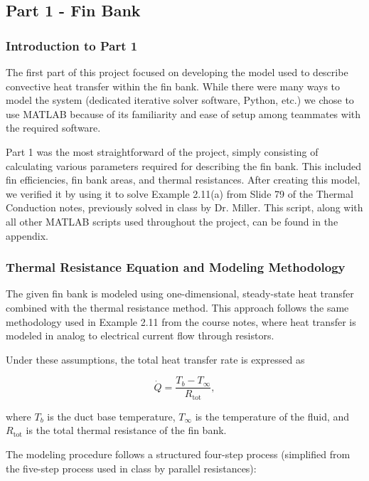 \documentclass[12pt, titlepage]{article}
\begin{document}
\subsection{Part 1 - Fin Bank}
\subsubsection{Introduction to Part 1}

The first part of this project focused on developing the model used to describe convective heat transfer within the fin bank. While there were many ways to model the system (dedicated iterative solver software, Python, etc.) we chose to use MATLAB because of its familiarity and ease of setup among teammates with the required software. 

Part 1 was the most straightforward of the project, simply consisting of calculating various parameters required for describing the fin bank. This included fin efficiencies, fin bank areas, and thermal resistances. After creating this model, we verified it by using it to solve Example 2.11(a) from Slide 79 of the Thermal Conduction notes, previously solved in class by Dr. Miller. This script, along with all other MATLAB scripts used throughout the project, can be found in the appendix. %

\subsubsection{Thermal Resistance Equation and Modeling Methodology}

The given fin bank is modeled using one-dimensional, steady-state heat transfer combined with the thermal resistance method. This approach follows the same methodology used in Example 2.11 from the course notes, where heat transfer is modeled in analog to electrical current flow through resistors.

Under these assumptions, the total heat transfer rate is expressed as

\begin{equation}
\dot{Q} = \frac{T_b - T_{\infty}}{R_{\text{tot}}},
\end{equation}

where $T_b$ is the duct base temperature, $T_{\infty}$ is the temperature of the fluid, and $R_{\text{tot}}$ is the total thermal resistance of the fin bank.

The modeling procedure follows a structured four-step process (simplified from the five-step process used in class by parallel resistances):
\end{document}
